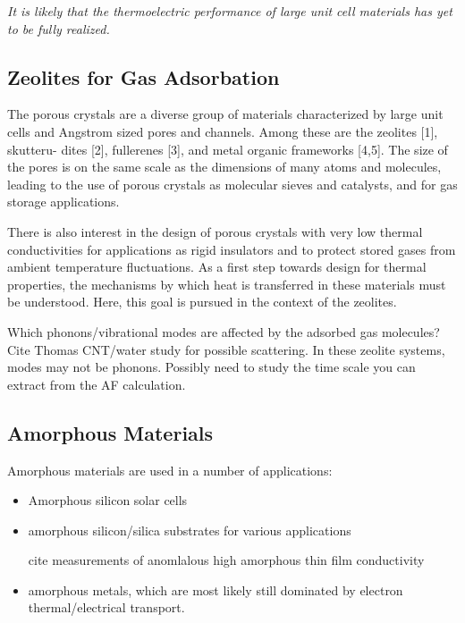 \documentclass[letterpaper,12pt]{article}
\begin{document}
\textit{It is
likely that the thermoelectric performance of large unit cell materials has yet to be fully realized.}

\subsection{\label{S-Intro-Motivation} Zeolites for Gas Adsorbation }

The porous crystals are a diverse group of materials
characterized by large unit cells and Angstrom sized pores
and channels. Among these are the zeolites [1], skutteru-
dites [2], fullerenes [3], and metal organic frameworks
[4,5]. The size of the pores is on the same scale as the
dimensions of many atoms and molecules, leading to the
use of porous crystals as molecular sieves and catalysts,
and for gas storage applications.

There is also
interest in the design of porous crystals with very low
thermal conductivities for applications as rigid insulators
and to protect stored gases from ambient temperature
fluctuations. As a first step towards design for thermal
properties, the mechanisms by which heat is transferred
in these materials must be understood. Here, this goal
is pursued in the context of the zeolites.

Which phonons/vibrational modes are affected by the adsorbed gas molecules?  Cite Thomas CNT/water study for possible scattering.  In these zeolite systems, modes may not be phonons.  Possibly need to study  the time scale you can extract from the AF calculation.

\subsection{\label{S-Intro-Motivation} Amorphous Materials }

Amorphous materials are used in a number of applications:

\begin{itemize}

\item Amorphous silicon solar cells

\item amorphous silicon/silica substrates for various applications

cite measurements of anomlalous high amorphous thin film conductivity

\item amorphous metals, which are most likely still dominated by electron thermal/electrical transport.

\end{itemize}
\end{document}
